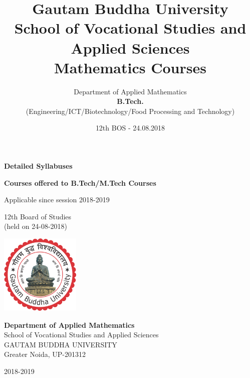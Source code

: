 \documentclass[11pt]{article}
\begin{document}
\pagecolor{blue!20}

\begin{titlepage}
	
	\begin{center}
		{\Huge\bf Detailed Syllabuses }
		
		
		
		\vspace{3cm}
		{\Huge\bf Courses offered to B.Tech/M.Tech Courses }
		
		\vspace{0.5cm}
		{\Large Applicable since session 2018-2019}
		
		\vspace{3cm}
		{\huge  12th Board of Studies }\\
		\vspace{0.5cm}
		{\Large (held on 24-08-2018)}
		
		\vfill
		\includegraphics[width=1.5in]{gbu_logo}
		
		\vspace{1cm}
		{\bf \LARGE {Department of Applied Mathematics}}\\
		{\Large {School of Vocational Studies  and Applied Sciences}}\\
		{\Large GAUTAM BUDDHA UNIVERSITY}\\
		{\Large Greater Noida, UP-201312}
		
		\vspace{1cm}
		{\huge 2018-2019}
	\end{center}
\end{titlepage}


\title{Gautam Buddha University \\ School of Vocational Studies and Applied Sciences\\ Mathematics Courses}
\author{Department of Applied Mathematics \\ \textbf{B.Tech.} \\{ (Engineering/ICT/Biotechnology/Food Processing and Technology)}}
\date{12th BOS - 24.08.2018}
\maketitle
\end{document}
